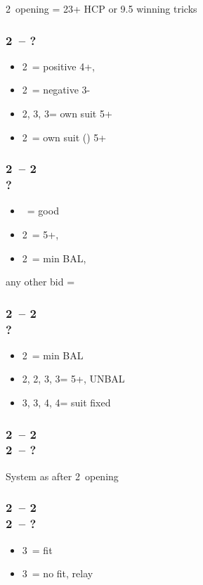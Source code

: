 2\clubs\ opening = 23+ HCP or 9.5 winning tricks

\subsubsection*{2\clubs\ -- ?}
\begin{itemize}
    \item 2\diams\ = positive 4+, \gf
    \item 2\hearts\ = negative 3-
    \item 2\spades, 3\clubs, 3\diams = own suit 5+
    \item 2\nt\ = own suit (\hearts) 5+
\end{itemize}

\subsubsection*{2\clubs\ -- 2\hearts \\ ?}
\begin{itemize}
    \item \pass\ = good \hearts
    \item 2\spades\ = 5+, \fonce
    \item 2\nt\ = min BAL, \nf
\end{itemize}

any other bid = \gf

\subsubsection*{2\clubs\ -- 2\diams \\ ?}
\begin{itemize}
    \item 2\nt\ = min BAL
    \item 2\hearts, 2\spades, 3\clubs, 3\diams = 5+, UNBAL
    \item 3\hearts, 3\spades, 4\clubs, 4\diams = suit fixed
\end{itemize}

\subsubsection*{2\clubs\ -- 2\diams \\ 2\nt\ -- ?}
System as after 2\nt\ opening

\subsubsection*{2\clubs\ -- 2\diams \\ 2\hearts\ -- ?}
\begin{itemize}
    \item 3\hearts\ = fit
    \item 3\spades\ = no fit, relay
\end{itemize}

